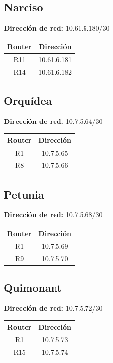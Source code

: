 \subsection{Narciso}
\textbf{Dirección de red:} 10.61.6.180/30
\begin{table}[!htbp]
\centering
  \begin{tabular}{|c|c|}
    \hline
	Router & Dirección\\ \hline
	R11 & 10.61.6.181\\ \hline
	R14 & 10.61.6.182\\
    \hline
  \end{tabular}
\end{table}

\subsection{Orquídea}
\textbf{Dirección de red:} 10.7.5.64/30
\begin{table}[!htbp]
\centering
  \begin{tabular}{|c|c|}
    \hline
	Router & Dirección\\ \hline
	R1 & 10.7.5.65\\ \hline
	R8 &10.7.5.66\\
    \hline
  \end{tabular}
\end{table}

\subsection{Petunia}
\textbf{Dirección de red:} 10.7.5.68/30
\begin{table}[!htbp]
\centering
  \begin{tabular}{|c|c|}
    \hline
	Router & Dirección\\ \hline
	R1 &10.7.5.69\\ \hline
	R9 &10.7.5.70\\
    \hline
  \end{tabular}
\end{table}

\subsection{Quimonant}
\textbf{Dirección de red:} 10.7.5.72/30
\begin{table}[!htbp]
\centering
  \begin{tabular}{|c|c|}
    \hline
	Router & Dirección\\ \hline
	R1 &10.7.5.73\\ \hline
	R15 &10.7.5.74\\
    \hline
  \end{tabular}
\end{table}

